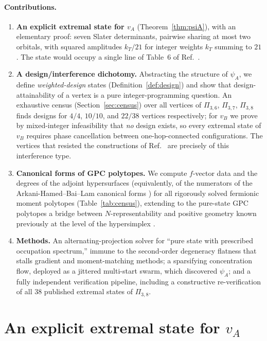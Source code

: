 \documentclass[11pt]{article}
\begin{document}
\paragraph{Contributions.}
\begin{enumerate}
\item \textbf{An explicit extremal state for $v_A$}
(Theorem~\ref{thm:psiA}), with an elementary proof: seven Slater
determinants, pairwise sharing at most two orbitals, with squared amplitudes
$k_T/21$ for integer weights $k_T$ summing to $21$. The state would occupy a
single line of Table~6 of Ref.~\cite{AK2008}.
\item \textbf{A design/interference dichotomy.} Abstracting the structure of
$\psi_A$, we define \emph{weighted-design} states
(Definition~\ref{def:design}) and show that design-attainability of a vertex
is a pure integer-programming question. An exhaustive census
(Section~\ref{sec:census}) over all vertices of $\Pi_{3,6}$, $\Pi_{3,7}$,
$\Pi_{3,8}$ finds designs for $4/4$, $10/10$, and $22/38$ vertices
respectively; for $v_B$ we prove by mixed-integer infeasibility that
\emph{no} design exists, so every extremal state of $v_B$ requires phase
cancellation between one-hop-connected configurations. The vertices that
resisted the constructions of Ref.~\cite{AK2008} are precisely of this
interference type.
\item \textbf{Canonical forms of GPC polytopes.} We compute
$f$-vector data and the degrees of the adjoint hypersurfaces (equivalently,
of the numerators of the Arkani-Hamed--Bai--Lam canonical forms
\cite{ABL2018}) for all rigorously solved fermionic moment polytopes
(Table~\ref{tab:census}), extending to the pure-state GPC polytopes a bridge
between $N$-representability and positive geometry known previously at the
level of the hypersimplex \cite{Castillo2021,LPW2020}.
\item \textbf{Methods.} An alternating-projection solver for ``pure state
with prescribed occupation spectrum,'' immune to the second-order
degeneracy flatness that stalls gradient and moment-matching methods; a
sparsifying concentration flow, deployed as a jittered multi-start swarm,
which discovered $\psi_A$; and a fully independent verification pipeline,
including a constructive re-verification of all $38$ published extremal
states of $\Pi_{3,8}$.
\end{enumerate}

\section{An explicit extremal state for $v_A$}
\label{sec:theorem}
\end{document}
